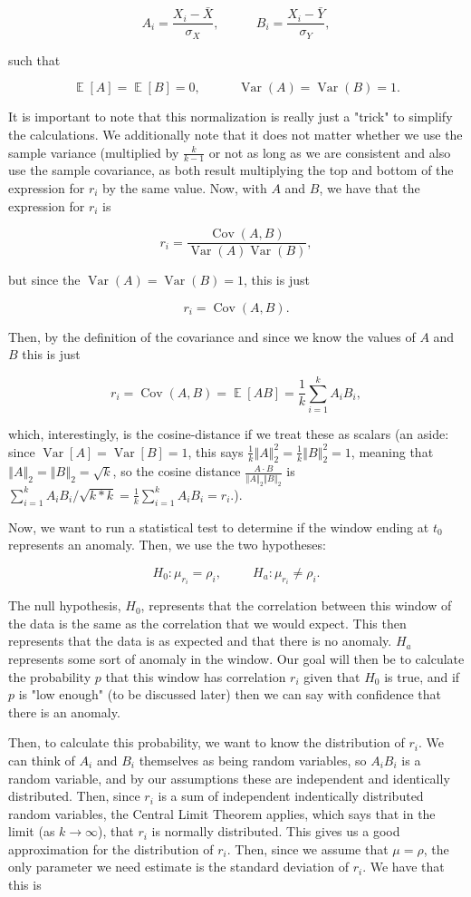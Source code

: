 \documentclass{article}
\newcommand{\norm}[1]{\left\Vert #1 \right\Vert}
\DeclareMathOperator{\E}{\mathbb{E}}
\DeclareMathOperator{\Cov}{\mathrm{Cov}}
\DeclareMathOperator{\Var}{\mathrm{Var}}
\begin{document}
$$A_i = \frac{X_i - \bar X}{\sigma_X},
~~~~~~~~~~~~~
B_i = \frac{X_i - \bar Y}{\sigma_Y},$$

such that

$$\E[A] = \E[B] = 0,
~~~~~~~~~~~~~
\Var(A) = \Var(B) = 1.$$

It is important to note that this normalization is really just a "trick" to simplify the calculations. We additionally note that it does not matter whether we use the sample variance (multiplied by $\frac{k}{k - 1}$ or not as long as we are consistent and also use the sample covariance, as both result multiplying the top and bottom of the expression for $r_i$ by the same value. Now, with $A$ and $B$, we have that the expression for $r_i$ is

$$r_i = \frac{\Cov(A, B)}{\Var(A)\Var(B)},$$

but since the $\Var(A) = \Var(B) = 1$, this is just

$$r_i = \Cov(A, B).$$

Then, by the definition of the covariance and since we know the values of $A$ and $B$ this is just

$$r_i = \Cov(A, B) = \E[AB] = \frac{1}{k} \sum_{i = 1}^k A_i B_i,$$

which, interestingly, is the cosine-distance if we treat these as scalars (an aside: since $\Var[A] = \Var[B] = 1$, this says $\frac{1}{k} \norm{A}_2^2 = \frac{1}{k} \norm{B}_2^2 = 1$, meaning that $\norm{A}_2 = \norm{B}_2 = \sqrt{k}$, so the cosine distance $\frac{A \cdot B}{\norm{A}_2 \norm{B}_2}$ is $\sum_{i = 1}^k A_i B_i / \sqrt{k * k} = \frac{1}{k} \sum_{i = 1}^k A_i B_i = r_i.$).

Now, we want to run a statistical test to determine if the window ending at $t_0$ represents an anomaly. Then, we use the two hypotheses:

$$H_0: \mu_{r_i} = \rho_i,
~~~~~~~~~~~
H_a: \mu_{r_i} \ne \rho_i.$$

The null hypothesis, $H_0$, represents that the correlation between this window of the data is the same as the correlation that we would expect. This then represents that the data is as expected and that there is no anomaly. $H_a$ represents some sort of anomaly in the window. Our goal will then be to calculate the probability $p$ that this window has correlation $r_i$ given that $H_0$ is true, and if $p$ is "low enough" (to be discussed later) then we can say with confidence that there is an anomaly.

Then, to calculate this probability, we want to know the distribution of $r_i$. We can think of $A_i$ and $B_i$ themselves as being random variables, so $A_i B_i$ is a random variable, and by our assumptions these are independent and identically distributed. Then, since $r_i$ is a sum of independent indentically distributed random variables, the Central Limit Theorem applies, which says that in the limit (as $k \to \infty$), that $r_i$ is normally distributed. This gives us a good approximation for the distribution of $r_i$. Then, since we assume that $\mu = \rho$, the only parameter we need estimate is the standard deviation of $r_i$. We have that this is
\end{document}
